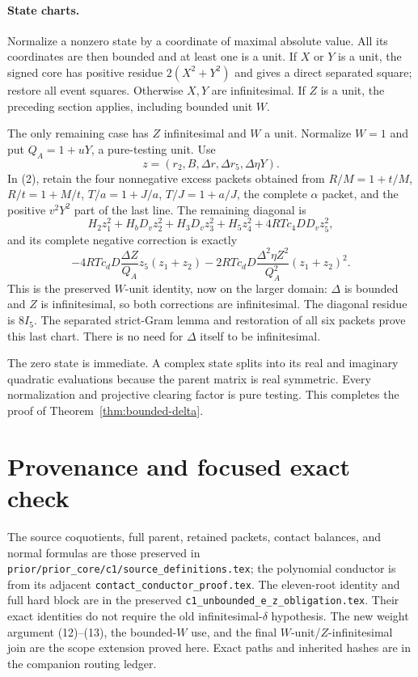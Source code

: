\paragraph{State charts.}
Normalize a nonzero state by a coordinate of maximal absolute value.
All its coordinates are then bounded and at least one is a unit. If
$X$ or $Y$ is a unit, the signed core has positive residue
$2(X^2+Y^2)$ and gives a direct separated square; restore all event
squares. Otherwise $X,Y$ are infinitesimal. If $Z$ is a unit, the
preceding section applies, including bounded unit $W$.

The only remaining case has $Z$ infinitesimal and $W$ a unit.
Normalize $W=1$ and put $Q_A=1+uY$, a pure-testing unit. Use
\[
 z=(r_2,B,\Delta r,\Delta r_5,\Delta\eta Y).
\]
In (2), retain the four nonnegative excess packets obtained from
$R/M=1+t/M$, $R/t=1+M/t$, $T/a=1+J/a$, $T/J=1+a/J$,
the complete $\alpha$ packet, and the positive $v^2Y^2$ part of the
last line. The remaining diagonal is
\[
 H_2z_1^2+H_bD_vz_2^2+H_3D_vz_3^2+H_5z_4^2
                   +4RTc_4DD_vz_5^2,
\]
and its complete negative correction is exactly
\[
 -4RTc_dD\frac{\Delta Z}{Q_A}z_5(z_1+z_2)
 -2RTc_dD\frac{\Delta^2\eta Z^2}{Q_A^2}(z_1+z_2)^2.
\]
This is the preserved $W$-unit identity, now on the larger domain:
$\Delta$ is bounded and $Z$ is infinitesimal, so both corrections
are infinitesimal. The diagonal residue is $8I_5$. The separated
strict-Gram lemma and restoration of all six packets prove this
last chart. There is no need for $\Delta$ itself to be infinitesimal.

The zero state is immediate. A complex state splits into its real and
imaginary quadratic evaluations because the parent matrix is real
symmetric. Every normalization and projective clearing factor is
pure testing. This completes the proof of Theorem~\ref{thm:bounded-delta}.

\section*{Provenance and focused exact check}

The source coquotients, full parent, retained packets, contact balances,
and normal formulas are those preserved in
\texttt{prior/prior\_core/c1/source\_definitions.tex}; the polynomial
conductor is from its adjacent \texttt{contact\_conductor\_proof.tex}.
The eleven-root identity and full hard block are in the preserved
\texttt{c1\_unbounded\_e\_z\_obligation.tex}. Their exact identities
do not require the old infinitesimal-$\delta$ hypothesis. The new
weight argument (12)--(13), the bounded-$W$ use, and the final
$W$-unit/$Z$-infinitesimal join are the scope extension proved here.
Exact paths and inherited hashes are in the companion routing ledger.

